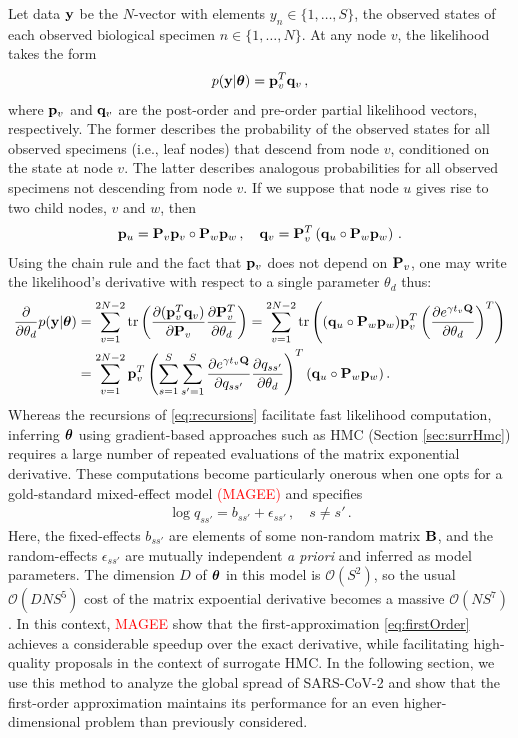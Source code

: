 \documentclass[12pt]{article} %
\begin{document}
 Let data $\y$ be the $N$-vector with elements $y_n\in \{1,\dots,S\}$, the observed states of each observed biological specimen $n \in \{1,\dots,N\}$.  At any node $v$, the likelihood takes the form \citep{ji2020gradients}
 \begin{align}
p(\y|\ttheta) = \p_v^T \q_v \, ,
 \end{align}
where $\p_v$ and $\q_v$ are the post-order and pre-order partial likelihood vectors, respectively.  The former describes the probability of the observed states for all observed specimens (i.e., leaf nodes) that descend from node $v$, conditioned on the state at node $v$. The latter describes analogous probabilities for all observed specimens not descending from node $v$.  If we suppose that node $u$ gives rise to two child nodes, $v$ and $w$, then 
\begin{align}\label{eq:recursions}
	\p_u = \P_v \p_v \circ \P_w \p_w\, ,  \quad \q_v= \P_v^T \left( \q_u \circ  \P_w \p_w\right) \, .
\end{align}
Using the chain rule and the fact that $\p_v$ does not depend on $\P_v$, one may write the likelihood's derivative with respect to a single parameter $\theta_d$ thus:
\begin{align}\label{eq:phyloGrad}
	\frac{\partial}{\partial \theta_d}  p(\y|\ttheta) 
	&=   \sum_{v=1}^{2N-2} \mbox{tr} \left( \frac{\partial (\p_v^T\q_v)}{\partial \P_v} \frac{\partial \P^T_v}{\partial \theta_d} \right)
	= \sum_{v=1}^{2N-2} \mbox{tr} \left(  (\q_u\circ \P_w\p_w) \p_v^T\left( \frac{\partial e^{\gamma t_v \QQ}}{\partial \theta_d}\right)^T\right)  \\ \nonumber
	&=\sum_{v=1}^{2N-2} \p_v^T \left(\sum_{s=1}^S \sum_{s'=1}^S \frac{\partial e^{\gamma t_v \QQ}}{\partial q_{ss'}} \frac{\partial q_{ss'}}{\partial \theta_d} \right)^T (\q_u\circ \P_w\p_w)  \, .
\end{align}
Whereas the recursions of \eqref{eq:recursions} facilitate fast likelihood computation, inferring $\ttheta$ using gradient-based approaches such as HMC (Section \ref{sec:surrHmc}) requires a large number of repeated evaluations of the matrix exponential derivative.  These computations become particularly onerous when one opts for a gold-standard mixed-effect model \textcolor{red}{(MAGEE)} and specifies
\begin{align}\label{eq:mixed}
\log q_{ss'} = b_{ss'} + \epsilon_{ss'} \,, \quad s\neq s'\, .
\end{align} 
Here, the fixed-effects $b_{ss'}$ are elements of some non-random matrix $\B$, and the random-effects $\epsilon_{ss'}$ are mutually independent \emph{a priori} and inferred as model parameters.  The dimension $D$ of $\ttheta$ in this model is $\mathcal{O}(S^2)$, so the usual $\mathcal{O}(DNS^5)$ cost of the matrix expoential derivative becomes a massive $\mathcal{O}(NS^7)$.  In this context, \textcolor{red}{MAGEE} show that the first-approximation \eqref{eq:firstOrder} achieves a considerable speedup over the exact derivative, while facilitating high-quality proposals in the context of surrogate HMC.  In the following section, we use this method to analyze the global spread of SARS-CoV-2 and show that the first-order approximation maintains its performance for an even higher-dimensional problem than previously considered.
\end{document}
